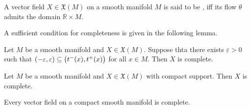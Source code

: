 \begin{definition}[Complete]
	A vector field $X \in \mathfrak{X}(M)$ on a smooth manifold $M$ is said to be , iff its flow $\theta$ admits the domain $\mathbb{R} \times M$.
\end{definition}

A sufficient condition for completeness is given in the following lemma.

\begin{lemma}
	Let $M$ be a smooth manifold and $X \in \mathfrak{X}(M)$. Suppose thta there exists $\varepsilon > 0$ such that $\intoo{-\varepsilon,\varepsilon} \subseteq \intoo[1]{t^-(x),t^+(x)}$ for all $x \in M$. Then $X$ is complete.
\end{lemma}

\begin{proposition}
	Let $M$ be a smooth manifold and $X \in \mathfrak{X}(M)$ with compact support. Then $X$ is complete.
\end{proposition}

\begin{corollary}
	Every vector field on a compact smooth manifold is complete.
\end{corollary}

